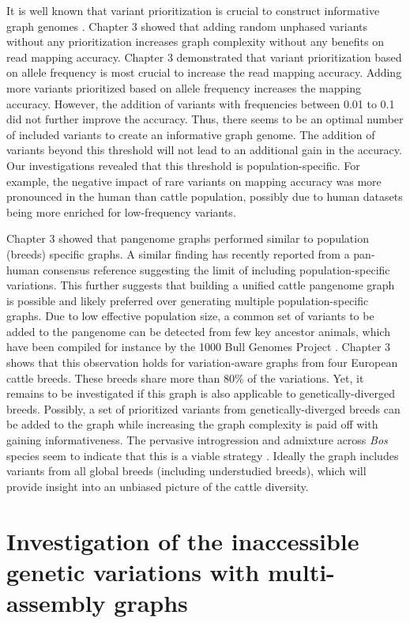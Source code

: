 \documentclass[../main.tex]{subfiles}
\begin{document}
It is well known that variant prioritization is crucial to construct informative graph genomes \citep{pritt2018forge,jain2021variant}. Chapter 3 showed that adding random unphased variants without any prioritization increases graph complexity without any benefits on read mapping accuracy. Chapter 3 demonstrated that variant prioritization based on allele frequency is most crucial to increase the read mapping accuracy. Adding more variants prioritized based on allele frequency increases the mapping accuracy. However, the addition of variants with frequencies between 0.01 to 0.1 did not further improve the accuracy. Thus, there seems to be an optimal number of included variants to create an informative graph genome. The addition of variants beyond this threshold will not lead to an additional gain in the accuracy. Our investigations revealed that this threshold is population-specific. For example, the negative impact of rare variants on mapping accuracy was more pronounced in the human than cattle population, possibly due to human datasets being more enriched  for low-frequency variants. 

Chapter 3 showed that pangenome graphs performed similar  to population (breeds) specific graphs. A similar finding has recently reported from a pan-human consensus reference \citep{kaminow2020virtue} suggesting the limit of including population-specific variations. This further suggests that building a unified cattle pangenome graph is possible and likely preferred over generating multiple population-specific graphs. Due to low effective population size, a common set of variants to be added to the pangenome can be detected from few key ancestor animals, which have been compiled for instance by the 1000 Bull Genomes Project \citep{hayes20191000}.  Chapter 3 shows that this observation holds for variation-aware graphs from four European cattle breeds. These breeds share more than 80\% of the variations. Yet, it remains to be investigated  if this graph is also applicable to genetically-diverged breeds. Possibly, a set of prioritized variants from genetically-diverged breeds can be added to the graph while  increasing the graph complexity is paid off with gaining informativeness. The pervasive introgression and admixture across \emph{Bos} species seem to indicate that this is a viable strategy \citep{wu2018pervasive}. Ideally the graph includes variants from all global breeds (including understudied breeds), which will provide insight into an unbiased picture of the cattle diversity. 

\section{Investigation of the inaccessible genetic variations with multi-assembly graphs}
\end{document}
